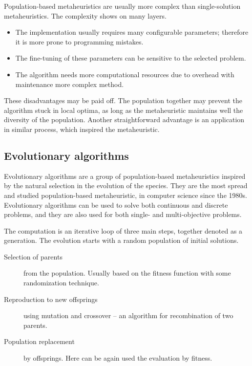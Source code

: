 \documentclass[
  print, %
  Table,   %
  nolof,     %
  nolot,     %
  11pt, %
  oneside  %
]{fithesis3}
\begin{document}
Population-based metaheuristics are usually more complex than single-solution metaheuristics. The complexity shows on many layers.

\begin{itemize}
    \item The implementation usually requires many configurable parameters; therefore it is more prone to programming mistakes.
    \item The fine-tuning of these parameters can be sensitive to the selected problem.
    \item The algorithm needs more computational resources due to overhead with maintenance more complex method.
\end{itemize}

These disadvantages may be paid off. The population together may prevent the algorithm stuck in local optima, as long as the metaheuristic maintains well the diversity of the population. Another straightforward advantage is an application in similar process, which inspired the metaheuristic.

\subsection{Evolutionary algorithms}
\label{subsec:opt-popul-ea}

Evolutionary algorithms are a group of population-based metaheuristics inspired by the natural selection in the evolution of the species. They are the most spread and studied population-based metaheuristic, in computer science since the 1980s. Evolutionary algorithms can be used to solve both continuous and discrete problems, and they are also used for both single- and multi-objective problems.

The computation is an iterative loop of three main steps, together denoted as a generation. The evolution starts with a random population of initial solutions.

\begin{description}
    \item[Selection of parents] from the population. Usually based on the fitness function with some randomization technique.
    \item[Reproduction to new offsprings] using mutation and crossover -- an algorithm for recombination of two parents. 
    \item[Population replacement] by offsprings. Here can be again used the evaluation by fitness. 
\end{description}
\end{document}
